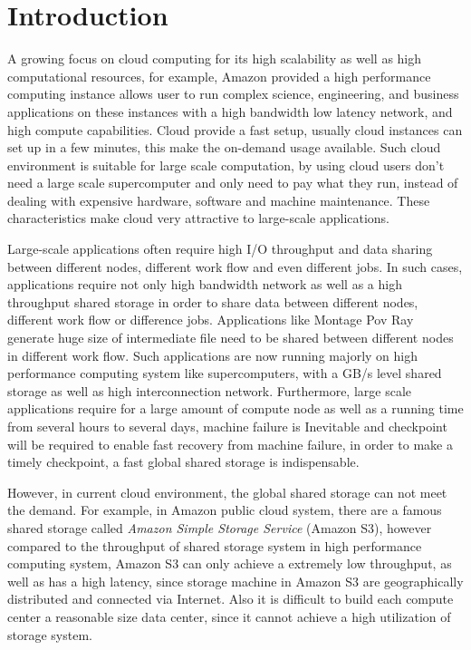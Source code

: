 \section{Introduction}
\label{sec:introduction}
A growing focus on cloud computing for its high scalability as well as high computational
resources, for example, Amazon provided a high performance computing instance allows user to run
complex science, engineering, and business applications on these instances with a high bandwidth low latency
network, and high compute capabilities.
Cloud provide a fast setup, usually cloud instances can set up in a few minutes, this
make the on-demand usage available.
Such cloud environment is suitable for large scale
computation, by using cloud users don't need a large scale supercomputer and only need to pay
what they run, instead of dealing with expensive hardware, software and machine maintenance.
These characteristics make cloud very attractive to large-scale applications.

Large-scale applications often require high I/O
throughput and data sharing between different nodes, different work flow and even different jobs.
In such cases, applications require not only high bandwidth network as well as a high throughput
shared storage in order to share data between different nodes, different work flow or difference
jobs.
Applications like Montage\cite{montage} Pov Ray\cite{povray} generate huge size of intermediate file
need to be shared between different nodes in different work flow.
Such applications are now running majorly on high performance computing system like supercomputers,
with a GB/s level shared storage as well as high interconnection network.
Furthermore, large scale applications require for a large amount of compute node as well as a
running time from several hours to several days, machine failure is Inevitable and checkpoint will be required to enable
fast recovery from machine failure\cite{checkpointing}, in order to make a timely checkpoint, a
fast global shared storage is indispensable.

However, in current cloud environment, the global shared storage can not meet the demand.
For example, in Amazon public cloud system, there are a famous shared storage called \emph{Amazon
Simple Storage Service} (Amazon S3)\cite{AMAZON_AWS}, however compared to the throughput of shared
storage system in high performance computing system, Amazon S3 can only achieve a extremely low throughput,
as well as has a high latency, since storage machine in Amazon S3 are geographically distributed and connected via Internet.
Also it is difficult to build each compute center a reasonable size data center, since it cannot
achieve a high utilization of storage system.

